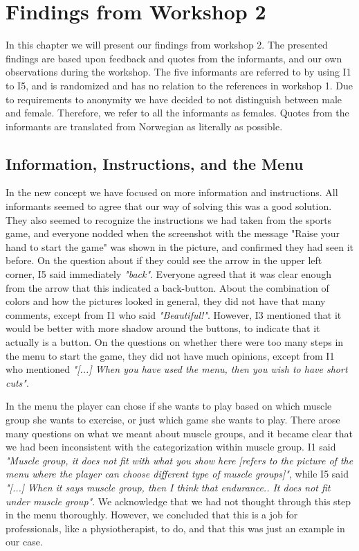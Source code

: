 \chapter{Findings from Workshop 2}

In this chapter we will present our findings from workshop 2. The presented findings are based upon feedback and quotes from the informants, and our own observations during the workshop. The five informants are referred to by using I1 to I5, and is randomized and has no relation to the references in workshop 1. Due to requirements to anonymity we have decided to not distinguish between male and female. Therefore, we refer to all the informants as females. Quotes from the informants are translated from Norwegian as literally as possible. 

\section{Information, Instructions, and the Menu}

In the new concept we have focused on more information and instructions. All informants seemed to agree that our way of solving this was a good solution. They also seemed to recognize the instructions we had taken from the sports game, and everyone nodded  when the screenshot with the message "Raise your hand to start the game" was shown in the picture, and confirmed they had seen it before. On the question about if they could see the arrow in the upper left corner, I5 said immediately \emph{"back"}. Everyone agreed that it was clear enough from the arrow that this indicated a back-button. About the combination of colors and how the pictures looked in general, they did not have that many comments, except from I1 who said \emph{"Beautiful!"}.  However, I3 mentioned that it would be better with more shadow around the buttons, to indicate that it actually is a button. On the questions on whether there were too many steps in the menu to start the game, they did not have much opinions, except from I1 who mentioned \emph{"[...] When you have used the menu, then you wish to have short cuts"}. 

In the menu the player can chose if she wants to play based on which muscle group she wants to exercise, or just which game she wants to play. There arose many questions on what we meant about muscle groups, and it became clear that we had been inconsistent with the categorization within muscle group. I1 said \emph{"Muscle group, it does not fit with what you show here [refers to the picture of the menu where the player can choose different type of muscle groups]"}, while I5 said \emph{"[...] When it says muscle group, then I think that endurance.. It does not fit under muscle group"}. We acknowledge that we had not thought through this step in the menu thoroughly. However, we concluded that this is a job for professionals, like a physiotherapist, to do, and that this was just an example in our case.  

